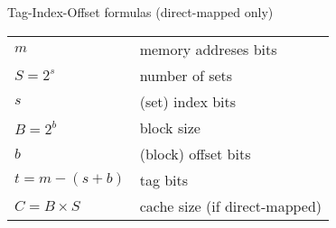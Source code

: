 \begin{frame}{Tag-Index-Offset formulas (direct-mapped only)}
\def\arraystretch{1.5}
\begin{tabular}{ll}
$m$ & memory addreses bits \\
$S=2^s$ & number of sets \\
$s$  & (set) index bits \\
$B=2^b$ & block size \\
$b$ & (block) offset bits \\
$t = m - (s+b)$ & tag bits \\
$C = B \times S$ & cache size (if direct-mapped) \\
\end{tabular}
\end{frame}

